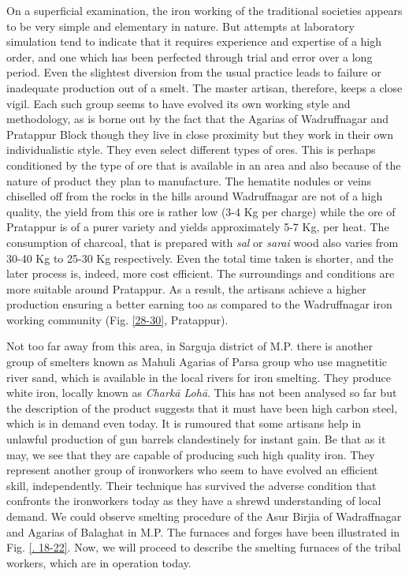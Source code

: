 On a superficial examination, the iron working of the traditional societies appears to be very simple and elementary in nature. But attempts at laboratory simulation tend to indicate that it requires experience and expertise of a high order, and one which has been perfected through trial and error over a long period. Even the slightest diversion from the usual practice leads to failure or inadequate production out of a smelt. The master artisan, therefore, keeps a close vigil. Each such group seems to have evolved its own working style and methodology, as is borne out by the fact that the Agarias of Wadruffnagar and Pratappur Block though they live in close proximity but they work in their own individualistic style. They even select different types of ores. This is perhaps conditioned by the type of ore that is available in an area and also because of the nature of product they plan to manufacture. The hematite nodules or veins chiselled off from the rocks in the hills around Wadruffnagar are not of a high quality, the yield from this ore is rather low (3-4 Kg per charge) while the ore of Pratappur is of a purer variety and yields approximately 5-7 Kg, per heat. The consumption of charcoal, that is prepared with {\it sal} or {\it sarai} wood also varies from 30-40 Kg to 25-30 Kg respectively. Even the total time taken is shorter, and the later process is, indeed, more cost efficient. The surroundings and conditions are more suitable around Pratappur. As a result, the artisans achieve a higher production ensuring a better earning too as compared to the Wadruffnagar iron working community (Fig. \ref{28-30}, Pratappur).

Not too far away from this area, in Sarguja district of M.P. there is another group of smelters known as Mahuli Agarias of Parsa group who use magnetitic river sand, which is available in the local rivers for iron smelting. They produce white iron, locally known as {\it Charkā Lohā}. This has not been analysed so far but the description of the product suggests that it must have been high carbon steel, which is in demand even today. It is rumoured that some artisans help in unlawful production of gun barrels clandestinely for instant gain. Be that as it may, we see that they are capable of producing such high quality iron. They represent another group of ironworkers who seem to have evolved an efficient skill, independently. Their technique has survived the adverse condition that confronts the ironworkers today as they have a shrewd understanding of local demand. We could observe smelting procedure of the Asur Birjia of Wadraffnagar and Agarias of Balaghat in M.P. The furnaces and forges have been illustrated in Fig. \ref{. 18-22}. Now, we will proceed to describe the smelting furnaces of the tribal workers, which are in operation today.

